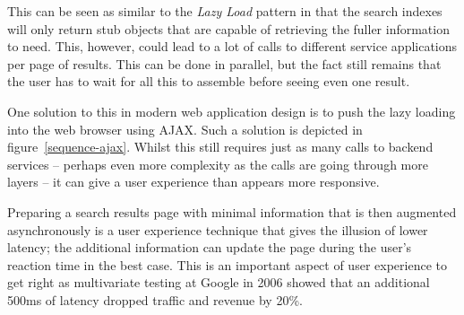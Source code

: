 \documentclass[a4paper]{report}
\begin{document}
This can be seen as similar to the \emph{Lazy Load} pattern
\cite{fowler2002patterns} in that the search indexes will only return
stub objects that are capable of retrieving the fuller information
to need. This, however, could lead to a lot of calls to different
service applications per page of results. This can be done in parallel, but
the fact still remains that the user has to wait for all this to
assemble before seeing even one result.

One solution to this in modern web application design is to
push the lazy loading into the web browser using AJAX. \cite{garrett2005ajax}
Such a solution is depicted in figure~\ref{sequence-ajax}. Whilst
this still requires just as many calls to backend services --
perhaps even more complexity as the calls are going through
more layers -- it can give a user experience than appears more responsive.

Preparing a search results page with minimal information that is then
augmented asynchronously is a user experience technique that gives the
illusion of lower latency; the additional information can update the page
during the user's reaction time in the best case. This is an important
aspect of user experience to get right as multivariate testing at Google
in 2006 showed that an additional 500ms of latency dropped traffic
and revenue by 20\%. \cite{linden2006marissa}
\end{document}
